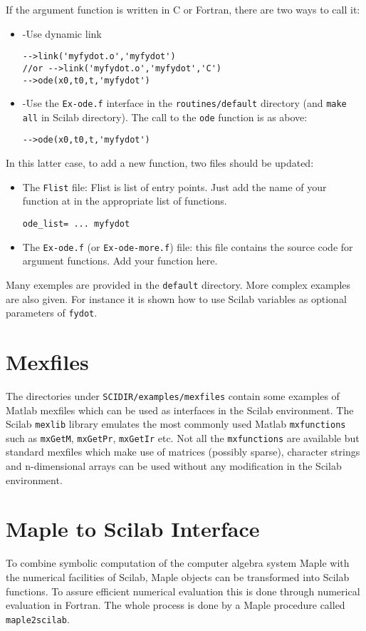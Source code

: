If the argument function is written in C or Fortran, there
are two ways to call it:
\begin{itemize}
\item -Use dynamic link
\begin{verbatim}
-->link('myfydot.o','myfydot')  
//or -->link('myfydot.o','myfydot','C')
-->ode(x0,t0,t,'myfydot')
\end{verbatim}
\item -Use the {\tt Ex-ode.f} interface in the {\tt routines/default}
directory (and {\tt make all} in Scilab directory).
The call to the {\tt ode} function is as above:
\begin{verbatim}
-->ode(x0,t0,t,'myfydot')
\end{verbatim}
\end{itemize}
In this latter case, to add a new function, two files should be updated:
\begin{itemize}
\item The {\tt Flist} file: Flist is list of entry points. Just add the 
name of your function at in the appropriate list of functions.
\begin{verbatim}
ode_list= ... myfydot
\end{verbatim}
\item The {\tt Ex-ode.f} (or {\tt Ex-ode-more.f}) file: this file contains the 
source code for argument functions. Add your function here.
\end{itemize}

Many exemples are provided in the {\tt default} directory.
More complex examples are also given. For instance it is shown 
how to use Scilab variables as optional parameters of {\tt fydot}.
\section{Mexfiles}
The directories under \verb!SCIDIR/examples/mexfiles! contain 
some examples of Matlab mexfiles which can be used as interfaces
in the Scilab environment. The Scilab \verb!mexlib! library emulates
the most commonly used Matlab \verb!mxfunctions! such as 
\verb!mxGetM!, \verb!mxGetPr!, \verb!mxGetIr! etc. Not all the 
\verb!mxfunctions! are available but standard mexfiles which make use
of matrices (possibly sparse), character strings and n-dimensional arrays 
can be used without any modification in the Scilab environment.
 
\section{Maple to Scilab Interface}
To combine symbolic computation of the computer algebra system Maple with the 
numerical facilities
of Scilab, Maple objects can be transformed into Scilab functions. To assure 
efficient numerical evaluation this is done through numerical evaluation in 
Fortran. The whole process is done by a Maple procedure called 
\verb/maple2scilab/.
